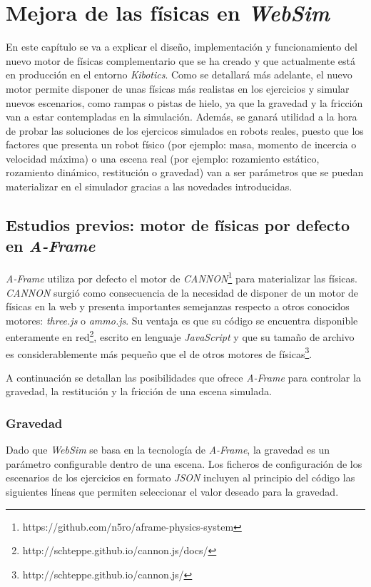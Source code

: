 \chapter{Mejora de las físicas en \textit{WebSim}}
\label{chap:motor_fisicas} 


En este capítulo se va a explicar el diseño, implementación y funcionamiento del nuevo motor de físicas complementario que se ha creado y que actualmente está en producción en el entorno \textit{Kibotics}. Como se detallará más adelante, el nuevo motor permite disponer de unas físicas más realistas en los ejercicios y simular nuevos escenarios, como rampas o pistas de hielo, ya que la gravedad y la fricción van a estar contempladas en la simulación. Además, se ganará utilidad a la hora de probar las soluciones de los ejercicos simulados en robots reales, puesto que los factores que presenta un robot físico (por ejemplo: masa, momento de incercia o velocidad máxima) o una escena real (por ejemplo: rozamiento estático, rozamiento dinámico, restitución o gravedad) van a ser parámetros que se puedan materializar en el simulador gracias a las novedades introducidas.


\section{Estudios previos: motor de físicas por defecto en \textit{A-Frame}}
\textit{A-Frame} utiliza por defecto el motor de  \textit{CANNON}\footnote{https://github.com/n5ro/aframe-physics-system} para materializar las físicas. \textit{CANNON} surgió como consecuencia de la necesidad de disponer de un motor de físicas en la web y presenta importantes semejanzas respecto a otros conocidos motores: \textit{three.js} o \textit{ammo.js}. Su ventaja es que su código se encuentra disponible enteramente en red\footnote{http://schteppe.github.io/cannon.js/docs/}, escrito en lenguaje \textit{JavaScript} y que su tamaño de archivo es considerablemente más pequeño que el de otros motores de físicas\footnote{http://schteppe.github.io/cannon.js/}.\newline

A continuación se detallan las posibilidades que ofrece \textit{A-Frame} para controlar la gravedad, la restitución y la fricción de una escena simulada.

\subsection{Gravedad} 
Dado que \textit{WebSim} se basa en la tecnología de \textit{A-Frame}, la gravedad es un parámetro configurable dentro de una escena. Los ficheros de configuración de los escenarios de los ejercicios en formato \textit{JSON} incluyen al principio del código las siguientes líneas que permiten seleccionar el valor deseado para la gravedad.

